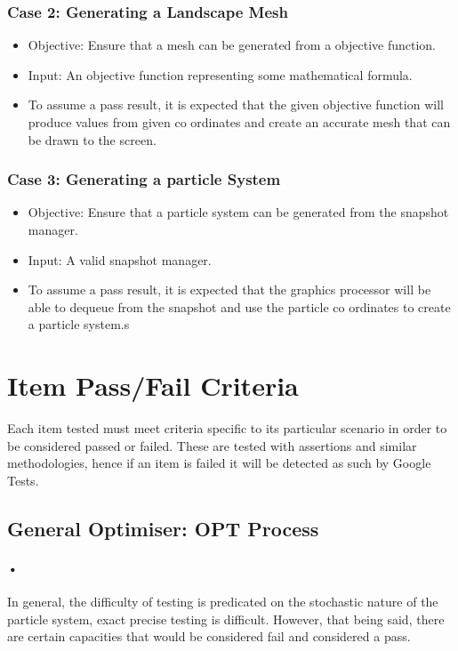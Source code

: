 \documentclass[11pt]{article}
\begin{document}
\subsubsection{Case 2: Generating a Landscape Mesh}
\begin{itemize}
	\item Objective: Ensure that a mesh can be generated from a objective function.
	\item Input: An objective function representing some mathematical formula.
	\item To assume a pass result, it is expected that the given objective function will produce values from given co ordinates and create an accurate mesh that can be drawn to the screen.
\end{itemize}

\subsubsection{Case 3: Generating a particle System}
\begin{itemize}
	\item Objective: Ensure that a particle system can be generated from the snapshot manager.
	\item Input: A valid snapshot manager.
	\item To assume a pass result, it is expected that the graphics processor will be able to dequeue from the snapshot and use the particle co ordinates to create a particle system.s
\end{itemize}

\section{Item Pass/Fail Criteria}
Each item tested must meet criteria specific to its particular scenario in order to be considered passed or failed. These are tested with assertions and similar methodologies, hence if an item is failed it will be detected as such by Google Tests.

\subsection{General Optimiser: OPT Process}
\paragraph{•}
In general, the difficulty of testing is predicated on the stochastic nature of the particle system, exact precise testing is difficult. However, that being said, there are certain capacities that would be considered fail and considered a pass. 
\end{document}
